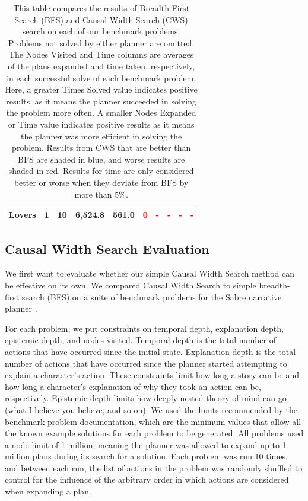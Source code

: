 \documentclass[letterpaper]{article} %
\begin{document}
\begin{table}[t]
\begin{tabular}{|c c | r r r | r r r r r |}
 Lovers & 1 & 10 & 6,524.8 & 561.0 & \textcolor{red}{0} & \textcolor{red}{-} & \textcolor{red}{-} & \textcolor{red}{-} & \textcolor{red}{-}\\  
 \hline
 
\end{tabular}
\caption{This table compares the results of Breadth First Search (BFS) and Causal Width Search (CWS) search on each of our benchmark problems. Problems not solved by either planner are omitted. The Nodes Visited and Time columns are averages of the plans expanded and time taken, respectively, in each successful solve of each benchmark problem. Here, a greater Times Solved value indicates positive results, as it means the planner succeeded in solving the problem more often. A smaller Nodes Expanded or Time value indicates positive results as it means the planner was more efficient in solving the problem. Results from CWS that are better than BFS are shaded in blue, and worse results are shaded in red. Results for time are only considered better or worse when they deviate from BFS by more than $5\%$.}
\label{bfstable}
\end{table}

\subsection{Causal Width Search Evaluation}

We first want to evaluate whether our simple Causal Width Search method can be effective on its own. We compared Causal Width Search to simple breadth-first search (BFS) on a suite of benchmark problems for the Sabre narrative planner \cite{ware2023collection}. 

For each problem, we put constraints on temporal depth, explanation depth, epistemic depth, and nodes visited. Temporal depth is the total number of actions that have occurred since the initial state. Explanation depth is the total number of actions that have occurred since the planner started attempting to explain a character's action. These constraints limit how long a story can be and how long a character's explanation of why they took an action can be, respectively. Epistemic depth limits how deeply nested theory of mind can go (what I believe you believe, and so on). We used the limits recommended by the benchmark problem documentation, which are the minimum values that allow all the known example solutions for each problem to be generated. All problems used a node limit of 1 million, meaning the planner was allowed to expand up to 1 million plans during its search for a solution. Each problem was run 10 times, and between each run, the list of actions in the problem was randomly shuffled to control for the influence of the arbitrary order in which actions are considered when expanding a plan.
\end{document}
